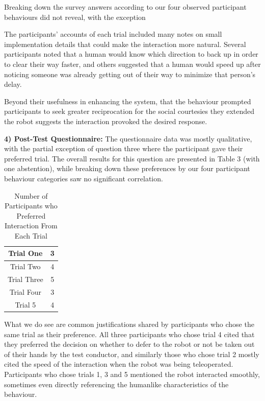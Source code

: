 \documentclass[letterpaper, 10 pt, conference]{ieeeconf}  %
\begin{document}
Breaking down the survey answers according to our four observed participant behaviours did not reveal, with the exception 

The participants’ accounts of each trial included many notes on small implementation details that could make the interaction more natural. Several participants noted that a human would know which direction to back up in order to clear their way faster, and others suggested that a human would speed up after noticing someone was already getting out of their way to minimize that person's delay. 

Beyond their usefulness in enhancing the system, that the behaviour prompted participants to seek greater reciprocation for the social courtesies they extended the robot suggests the interaction provoked the desired response.

\textbf{4) Post-Test Questionnaire:} The questionnaire data was mostly qualitative, with the partial exception of question three where the participant gave their preferred trial. The overall results for this question are presented in Table 3 (with one abstention), while breaking down these preferences by our four participant behaviour categories saw no significant correlation.

\begin{table}[h]
\caption{Number of Participants who Preferred Interaction From Each Trial }
\label{Preferemces}
\begin{center}
\begin{tabular}{|c||c|}
\hline
Trial One & 3\\
\hline
Trial Two & 4\\
\hline
Trial Three & 5\\
\hline
Trial Four & 3\\
\hline
Trial 5 & 4\\
\hline
\end{tabular}
\end{center}
\end{table}

What we do see are common justifications shared by participants who chose the same trial as their preference. All three participants who chose trial 4 cited that they preferred the decision on whether to defer to the robot or not be taken out of their hands by the test conductor, and similarly those who chose trial 2 mostly cited the speed of the interaction when the robot was being teleoperated. Participants who chose trials 1, 3 and 5 mentioned the robot interacted smoothly, sometimes even directly referencing the humanlike characteristics of the behaviour.
\end{document}
